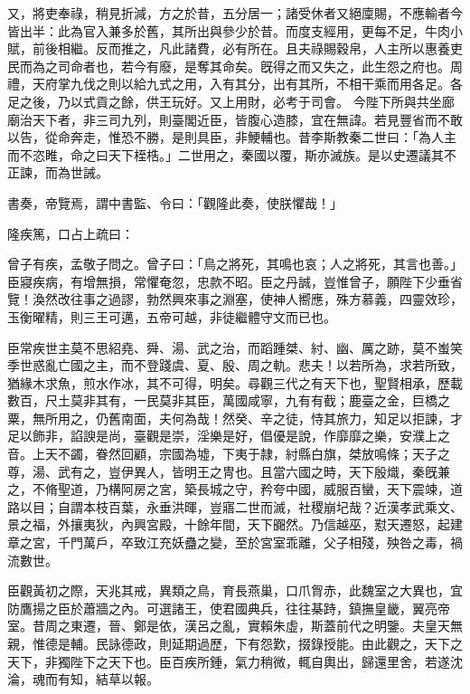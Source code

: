 \begin{pinyinscope}
 
又，將吏奉祿，稍見折減，方之於昔，五分居一；諸受休者又絕廩賜，不應輸者今皆出半：此為官入兼多於舊，其所出與參少於昔。而度支經用，更每不足，牛肉小賦，前後相繼。反而推之，凡此諸費，必有所在。且夫祿賜穀帛，人主所以惠養吏民而為之司命者也，若今有廢，是奪其命矣。旣得之而又失之，此生怨之府也。周禮，天府掌九伐之則以給九式之用，入有其分，出有其所，不相干乘而用各足。各足之後，乃以式貢之餘，供王玩好。又上用財，必考于司會。
 今陛下所與共坐廊廟治天下者，非三司九列，則臺閣近臣，皆腹心造膝，宜在無諱。若見豐省而不敢以告，從命奔走，惟恐不勝，是則具臣，非鯁輔也。昔李斯教秦二世曰：「為人主而不恣睢，命之曰天下桎梏。」二世用之，秦國以覆，斯亦滅族。是以史遷議其不正諫，而為世誡。
 
 
 
 
 書奏，帝覽焉，謂中書監、令曰：「觀隆此奏，使朕懼哉！」
 
 
 
 
 隆疾篤，口占上疏曰：
 
 
 
 
 曾子有疾，孟敬子問之。曾子曰：「鳥之將死，其鳴也哀；人之將死，其言也善。」臣寢疾病，有增無損，常懼奄忽，忠款不昭。臣之丹誠，豈惟曾子，願陛下少垂省覽！渙然改往事之過謬，勃然興來事之淵塞，使神人嚮應，殊方慕義，四靈效珍，玉衡曜精，則三王可邁，五帝可越，非徒繼體守文而已也。
 
 
 
 
 臣常疾世主莫不思紹堯、舜、湯、武之治，而蹈踵桀、紂、幽、厲之跡，莫不蚩笑季世惑亂亡國之主，而不登踐虞、夏、殷、周之軌。悲夫！以若所為，求若所致，猶緣木求魚，煎水作冰，其不可得，明矣。尋觀三代之有天下也，聖賢相承，歷載數百，尺土莫非其有，一民莫非其臣，萬國咸寧，九有有截；鹿臺之金，巨橋之粟，無所用之，仍舊南面，夫何為哉！然癸、辛之徒，恃其旅力，知足以拒諫，才足以飾非，諂諛是尚，臺觀是崇，淫樂是好，倡優是說，作靡靡之樂，安濮上之音。上天不蠲，眷然回顧，宗國為墟，下夷于隷，紂縣白旗，桀放鳴條；天子之尊，湯、武有之，豈伊異人，皆明王之冑也。且當六國之時，天下殷熾，秦旣兼之，不脩聖道，乃構阿房之宮，築長城之守，矜夸中國，威服百蠻，天下震竦，道路以目；自謂本枝百葉，永垂洪暉，豈寤二世而滅，社稷崩圮哉？近漢孝武乘文、景之福，外攘夷狄，內興宮殿，十餘年間，天下嚻然。乃信越巫，懟天遷怒，起建章之宮，千門萬戶，卒致江充妖蠱之變，至於宮室乖離，父子相殘，殃咎之毒，禍流數世。
 
 
 
 
 臣觀黃初之際，天兆其戒，異類之鳥，育長燕巢，口爪胷赤，此魏室之大異也，宜防鷹揚之臣於蕭牆之內。可選諸王，使君國典兵，往往棊跱，鎮撫皇畿，翼亮帝室。昔周之東遷，晉、鄭是依，漢呂之亂，實賴朱虛，斯蓋前代之明鑒。夫皇天無親，惟德是輔。民詠德政，則延期過歷，下有怨歎，掇錄授能。由此觀之，天下之天下，非獨陛下之天下也。臣百疾所鍾，氣力稍微，輒自輿出，歸還里舍，若遂沈淪，魂而有知，結草以報。
 

\end{pinyinscope}
